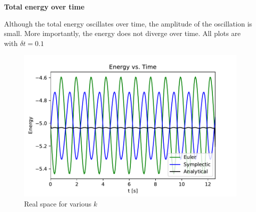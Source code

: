 \begin{problem}{2}
	\textbf{Total energy over time}

  Although the total energy oscillates over time, the amplitude of the
  oscillation is small. More importantly, the energy does not diverge over time.
  All plots are with $\delta t = 0.1$

\begin{figure}[ht!]
  \centering
	  \includegraphics[scale=0.6]{../figures/energy_time.pdf}
	\caption{Real space for various $k$}
\end{figure}
\end{problem}

